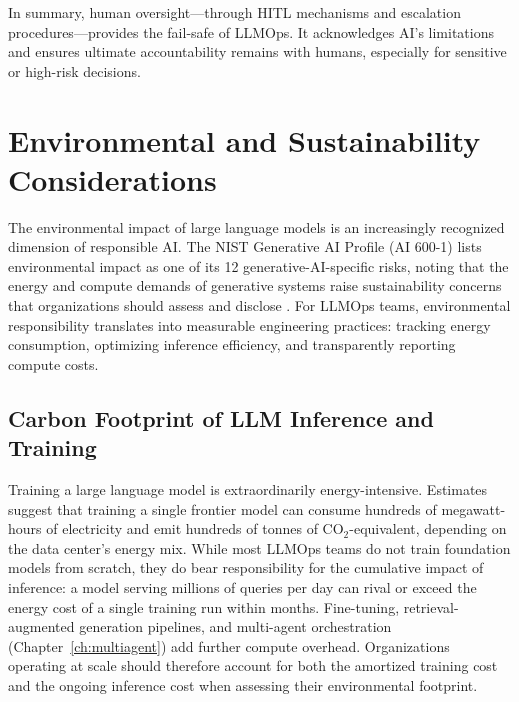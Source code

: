 \bigskip
In summary, human oversight---through HITL mechanisms and escalation procedures---provides the fail-safe of LLMOps. It acknowledges AI's limitations and ensures ultimate accountability remains with humans, especially for sensitive or high-risk decisions.

\section{Environmental and Sustainability Considerations}\label{sec:ethics-environment}

The environmental impact of large language models is an increasingly recognized dimension of responsible AI. The NIST Generative AI Profile (AI 600-1) lists environmental impact as one of its 12 generative-AI-specific risks, noting that the energy and compute demands of generative systems raise sustainability concerns that organizations should assess and disclose \cite{nist_ai_600_1_genai}. For LLMOps teams, environmental responsibility translates into measurable engineering practices: tracking energy consumption, optimizing inference efficiency, and transparently reporting compute costs.

\subsection{Carbon Footprint of LLM Inference and Training}\label{sec:ch11_carbon}

Training a large language model is extraordinarily energy-intensive. Estimates suggest that training a single frontier model can consume hundreds of megawatt-hours of electricity and emit hundreds of tonnes of CO$_2$-equivalent, depending on the data center's energy mix. While most LLMOps teams do not train foundation models from scratch, they do bear responsibility for the cumulative impact of inference: a model serving millions of queries per day can rival or exceed the energy cost of a single training run within months. Fine-tuning, retrieval-augmented generation pipelines, and multi-agent orchestration (Chapter~\ref{ch:multiagent}) add further compute overhead. Organizations operating at scale should therefore account for both the amortized training cost and the ongoing inference cost when assessing their environmental footprint.

